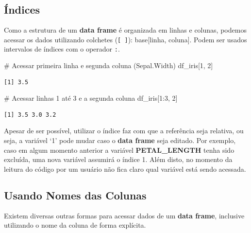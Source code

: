 \documentclass[
  letterpaper,
  DIV=11,
  numbers=noendperiod]{scrreprt}
\newenvironment{Shaded}{\begin{snugshade}}{\end{snugshade}}
\newcommand{\CommentTok}[1]{\textcolor[rgb]{0.37,0.37,0.37}{#1}}
\newcommand{\DecValTok}[1]{\textcolor[rgb]{0.68,0.00,0.00}{#1}}
\newcommand{\NormalTok}[1]{\textcolor[rgb]{0.00,0.23,0.31}{#1}}
\newcommand{\SpecialCharTok}[1]{\textcolor[rgb]{0.37,0.37,0.37}{#1}}
\begin{document}
\hypertarget{uxedndices}{%
\subsection{Índices}\label{uxedndices}}

Como a estrutura de um \textbf{data frame} é organizada em linhas e
colunas, podemos acessar os dados utilizando colchetes
(\texttt{{[}\ {]}}): base{[}linha, coluna{]}. Podem ser usados
intervalos de índices com o operador \texttt{:}.

\begin{Shaded}
\begin{Highlighting}[]
\CommentTok{\# Acessar primeira linha e segunda coluna (Sepal.Width)}
\NormalTok{df\_iris[}\DecValTok{1}\NormalTok{, }\DecValTok{2}\NormalTok{]}
\end{Highlighting}
\end{Shaded}

\begin{verbatim}
[1] 3.5
\end{verbatim}

\begin{Shaded}
\begin{Highlighting}[]
\CommentTok{\# Acessar linhas 1 até 3 e a segunda coluna}
\NormalTok{df\_iris[}\DecValTok{1}\SpecialCharTok{:}\DecValTok{3}\NormalTok{, }\DecValTok{2}\NormalTok{]}
\end{Highlighting}
\end{Shaded}

\begin{verbatim}
[1] 3.5 3.0 3.2
\end{verbatim}

Apesar de ser possível, utilizar o índice faz com que a referência seja
relativa, ou seja, a variável `1' pode mudar caso o \textbf{data frame}
seja editado. Por exemplo, caso em algum momento anterior a variável
\textbf{PETAL\_LENGTH} tenha sido excluída, uma nova variável assumirá o
índice 1. Além disto, no momento da leitura do código por um usuário não
fica claro qual variável está sendo acessada.

\hypertarget{usando-nomes-das-colunas}{%
\subsection{Usando Nomes das Colunas}\label{usando-nomes-das-colunas}}

Existem diversas outras formas para acessar dados de um \textbf{data
frame}, inclusive utilizando o nome da coluna de forma explícita.
\end{document}
